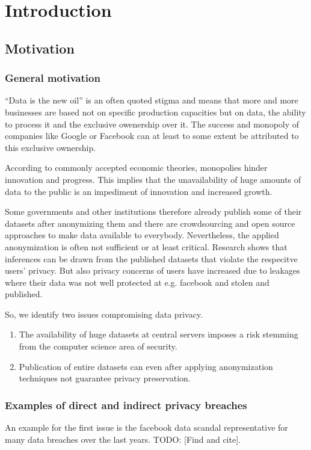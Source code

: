 
\chapter{Introduction}\label{chapter:introduction}
\section{Motivation}
\subsection{General motivation} \label{general-motivation}

“Data is the new oil” is an often quoted stigma and means that more and more businesses are
based not on specific production capacities but on data, the ability to process it and the exclusive owenership over it. The success and monopoly of
companies like Google or Facebook can at least to some extent be attributed to this exclusive ownership.

According to commonly accepted economic theories, monopolies hinder innovation and
progress. This implies that the unavailability of huge amounts of data to the public is an
impediment of innovation and increased growth.

Some governments and other institutions therefore already publish some of their datasets after anonymizing them and there are crowdsourcing and open source approaches to make
data available to everybody. 
Nevertheless, the applied anonymization is often not sufficient or at least critical. Research shows that inferences can be drawn from the published datasets that violate the respecitve users' privacy.
But also privacy concerns of users have increased due to leakages where their data was not well protected at e.g. facebook and stolen and published.

So, we identify two issues compromising data privacy. 
\begin{enumerate}
  \item The availability of huge datasets at central servers imposes a risk stemming from the computer science area of security. 
  \item Publication of entire datasets can even after applying anonymization techniques not guarantee privacy preservation.
\end{enumerate}

\subsection{Examples of direct and indirect privacy breaches}
An example for the first issue is the facebook data scandal representative for many data breaches over the last years. TODO: [Find and cite].

